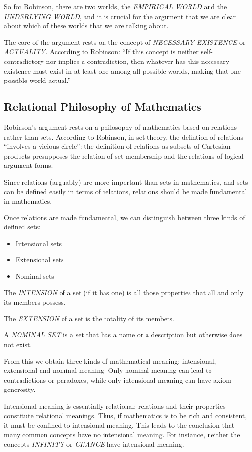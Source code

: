 \documentclass[11pt]{article}
\begin{document}
So for Robinson, there are two worlds, the \emph{EMPIRICAL WORLD} and 
the \emph{UNDERLYING WORLD}, and it is crucial for the argument that 
we are clear about which of these worlds that we are talking about.

The core of the argument rests on the concept of \emph{NECESSARY EXISTENCE}
or \emph{ACTUALITY}. According to Robinson: ``If this concept is neither 
self-contradictory nor implies a contradiction, then whatever has
this necessary existence must exist in at least one among all 
possible worlds, making that one possible world actual.''

\subsection{Relational Philosophy of Mathematics}
\label{sec-1.3}

Robinson's argument rests on a philosophy of mathematics
based on relations rather than sets. According to Robinson,
in set theory, the defintion of relations ``involves a 
vicious circle'': the definition of relations as subsets
of Cartesian products presupposes the relation of set
membership and the relations of logical argument forms.

Since relations (arguably) are more important than sets
in mathematics, and sets can be defined easily in terms
of relations, relations should be made fundamental in
mathematics.

Once relations are made fundamental, we can distinguish
between three kinds of defined sets:

\begin{itemize}
\item Intensional sets
\item Extensional sets
\item Nominal sets
\end{itemize}
The \emph{INTENSION} of a set (if it has one) is all those properties
that all and only its members possess.

The \emph{EXTENSION} of a set is the totality of its members.

A \emph{NOMINAL SET} is a set that has a name or a description but
otherwise does not exist.

From this we obtain three kinds of mathematical meaning: intensional,
extensional and nominal meaning. Only nominal meaning can lead to
contradictions or paradoxes, while only intensional meaning can
have axiom generosity.

Intensional meaning is essentially relational: relations and 
their properties constitute relational meanings. Thus, if 
mathematics is to be rich and consistent, it must be confined
to intensional meaning. This leads to the conclusion that
many common concepts have no intensional meaning. For instance,
neither the concepts \emph{INFINITY} or \emph{CHANCE} have intensional
meaning.
\end{document}
